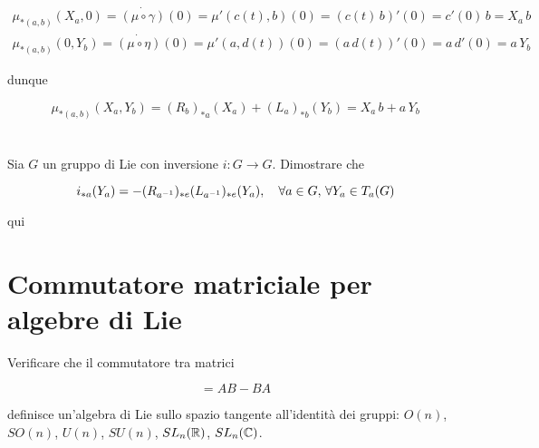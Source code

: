 \begin{gather}
	\mu_{*(a,b)}(X_{a}, 0) = \dot{ (\mu \circ \gamma) }(0) %
	= \mu'(c(t), b)(0) %
	= (c(t) \, b)'(0) %
	= c'(0) \, b %
	= X_{a} \, b \\
	\mu_{*(a,b)}(0, Y_{b}) = \dot{ (\mu \circ \eta) }(0) %
	= \mu'(a, d(t))(0) %
	= (a \, d(t))'(0) %
	= a \, d'(0) %
	= a \, Y_{b}
\end{gather}

dunque

\begin{equation}
	\mu_{*(a,b)}(X_{a},Y_{b}) = (R_{b})_{*a}(X_{a}) + (L_{a})_{*b}(Y_{b}) %
	= X_{a} \, b + a \, Y_{b}
\end{equation}

%

\newpage

%

\section{}\label{es3-8}

\begin{tcolorbox}
	Sia $ G $ un gruppo di Lie con inversione $ i : G \to G $. Dimostrare che
	
	\begin{equation}
		i_{*a}(Y_{a}) = -(R_{a^{-1}})_{*e}(L_{a^{-1}})_{*e} (Y_{a}) \qcomma \forall a \in G, \, \forall Y_{a} \in T_{a}(G)
	\end{equation}
\end{tcolorbox}

qui

%

\newpage

%

\section{Commutatore matriciale per algebre di Lie}\label{es3-9}

\begin{tcolorbox}
	Verificare che il commutatore tra matrici
	
	\begin{equation}
		[A,B] = AB - BA
	\end{equation}
	
	definisce un'algebra di Lie sullo spazio tangente all'identità dei gruppi: $ O(n) $, $ SO(n) $, $ U(n) $, $ SU(n) $, $ SL_{n}(\mathbb{R}) $, $ SL_{n}(\mathbb{C}) $.
\end{tcolorbox}

